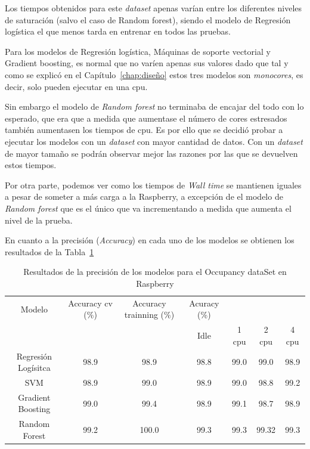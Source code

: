 \documentclass[a4paper, 12pt]{book}
\begin{document}
Los tiempos obtenidos para este \textit{dataset} apenas varían entre los diferentes niveles de saturación (salvo el caso de Random forest), siendo el modelo de Regresión logística el que menos tarda en entrenar en todos las pruebas. 

Para los modelos de Regresión logística, Máquinas de soporte vectorial y Gradient boosting, es normal que no varíen apenas sus valores dado que tal y como se explicó en el Capítulo~\ref{chap:diseño} estos tres modelos son \textit{monocores}, es decir, solo pueden ejecutar en una cpu. 

Sin embargo el modelo de \textit{Random forest} no terminaba de encajar del todo con lo esperado, que era que a medida que aumentase el número de cores estresados también aumentasen los tiempos de cpu. Es por ello que se decidió probar a ejecutar los modelos con un \textit{dataset} con mayor cantidad de datos. Con un \textit{dataset} de mayor tamaño se podrán observar mejor las razones por las que se devuelven estos tiempos.

Por otra parte, podemos ver como los tiempos de \textit{Wall time} se mantienen iguales a pesar de someter a más carga a la Raspberry, a excepción de el modelo de \textit{Random forest} que es el único que va incrementando a medida que aumenta el nivel de la prueba. 

En cuanto a la precisión (\textit{Accuracy}) en cada uno de los modelos se obtienen los resultados de la Tabla~\ref{tab:acc_Occraspberry}

\begin{table}[]
\begin{adjustbox}{width=\textwidth}
\centering
    \begin{tabular}{c  c  c  c  c  c  c}
    \hline
    Modelo & Accuracy cv (\%) & Accuracy trainning (\%) & Acuracy (\%) & & & \\
    \cline{4-7}
     &   &   &  Idle & 1 cpu & 2 cpu & 4 cpu \\
     \hline
     Regresión Logísitca & 98.9 & 98.9 & 98.8 & 99.0 & 99.0 & 98.9\\
     SVM & 98.9 & 99.0 & 98.9 & 99.0 & 98.8 & 99.2\\
     Gradient Boosting & 99.0 & 99.4 & 98.9 & 99.1 & 98.7 & 98.9\\
     Random Forest & 99.2 & 100.0 & 99.3 & 99.3 & 99.32 & 99.3\\
    \hline
    \end{tabular}
\end{adjustbox}
\caption{Resultados de la precisión de los modelos para el Occupancy dataSet en Raspberry}
\label{tab:acc_Occraspberry}
\end{table}
\end{document}
